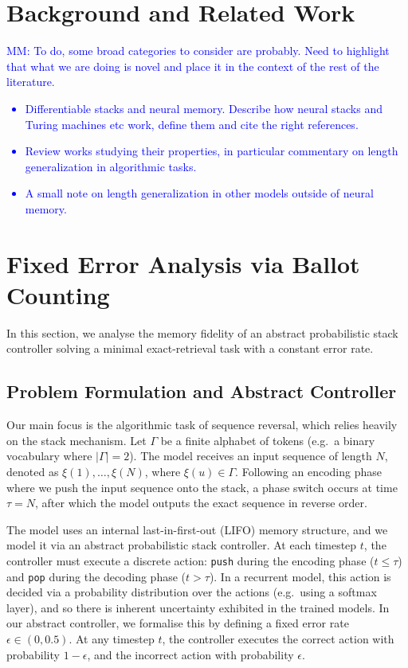 \documentclass[10pt]{article} %
\newcommand{\mm}[1]{\textcolor{blue}{MM: #1}}
\begin{document}
\section{Background and Related Work}
\mm{To do, some broad categories to consider are probably. Need to highlight that what we are doing is novel and place it in the context of the rest of the literature.
\begin{itemize}
    \item Differentiable stacks and neural memory. Describe how neural stacks and Turing machines etc work, define them and cite the right references. 
    \item Review works studying their properties, in particular commentary on length generalization in algorithmic tasks.
    \item A small note on length generalization in other models outside of neural memory.
\end{itemize}
}


\section{Fixed Error Analysis via Ballot Counting}
In this section, we analyse the memory fidelity of an abstract probabilistic stack controller solving a minimal exact-retrieval task with a constant error rate.

\subsection{Problem Formulation and Abstract Controller}

Our main focus is the algorithmic task of sequence reversal, which relies heavily on the stack mechanism. Let $\Gamma$ be a finite alphabet of tokens (e.g.\ a binary vocabulary where $|\Gamma| = 2$). The model receives an input sequence of length $N$, denoted as $\xi(1), \dots, \xi(N)$, where $\xi(u) \in \Gamma$. Following an encoding phase where we push the input sequence onto the stack, a phase switch occurs at time $\tau = N$, after which the model outputs the exact sequence in reverse order. 

The model uses an internal last-in-first-out (LIFO) memory structure, and we model it via an abstract probabilistic stack controller. At each timestep $t$, the controller must execute a discrete action: \texttt{push} during the encoding phase ($t \leq \tau$) and \texttt{pop} during the decoding phase ($t > \tau$). In a recurrent model, this action is decided via a probability distribution over the actions (e.g.\ using a softmax layer), and so there is inherent uncertainty exhibited in the trained models. In our abstract controller, we formalise this by defining a fixed error rate $\epsilon \in (0,0.5)$. At any timestep $t$, the controller executes the correct action with probability $1-\epsilon$, and the incorrect action with probability $\epsilon$.
\end{document}
